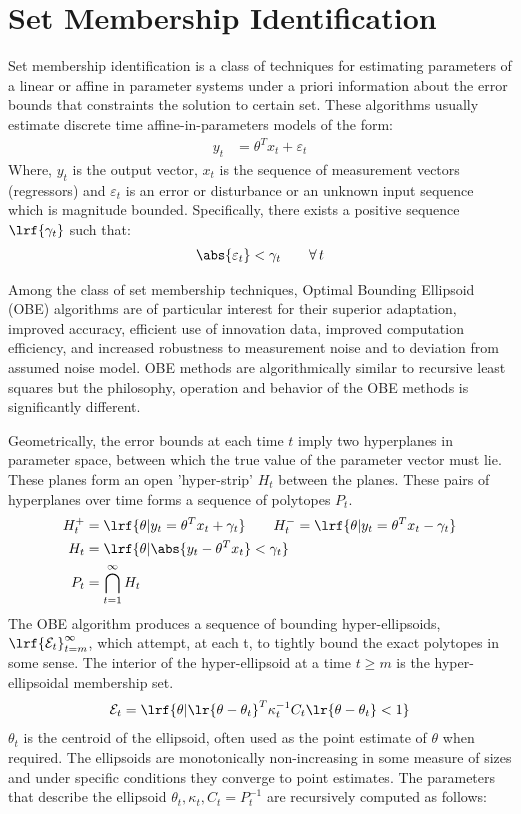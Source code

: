 \section{Set Membership Identification}

Set membership identification is a class of techniques for estimating parameters of a linear or affine in parameter systems under a priori information about the error bounds that constraints the solution to certain set. These algorithms usually estimate discrete time affine-in-parameters models of the form:
\begin{align}
        y_t &= \theta^T x_t + \varepsilon_t
\end{align}
Where, $y_t$ is the output vector, $x_t$ is the sequence of measurement vectors (regressors) and $\varepsilon_t$ is an error or disturbance or an unknown input sequence which is magnitude bounded. Specifically, there exists a positive sequence $\lrf{\gamma_t}$ such that:
\begin{align}
        \abs{\varepsilon_t} < \gamma_t \qquad \forall \, t
\end{align}

Among the class of set membership techniques, Optimal Bounding Ellipsoid (OBE) algorithms are of particular interest for their superior adaptation, improved accuracy, efficient use of innovation data, improved computation efficiency, and increased robustness to measurement noise and to deviation from assumed noise model. OBE methods are algorithmically similar to recursive least squares but the philosophy, operation and behavior of the OBE methods is significantly different.

Geometrically, the error bounds at each time $t$ imply two hyperplanes in parameter space, between which the true value of the parameter vector must lie. These planes form an open 'hyper-strip' $H_t$ between the planes. These pairs of hyperplanes over time forms a sequence of polytopes $P_t$.
\begin{align}
        H^+_t &= \lrf{\theta | y_t = \theta^T x_t + \gamma_t} \qquad
        H^-_t  = \lrf{\theta | y_t = \theta^T x_t - \gamma_t}\\
        H_t   &= \lrf{\theta | \abs{y_t - \theta^T x_t} < \gamma_t}\\
        P_t   &= \bigcap_{t=1}^{\infty} H_t
\end{align}
The OBE algorithm produces a sequence of bounding hyper-ellipsoids, $\lrf{\mathcal{E}_t}_{t = m}^{\infty}$, which attempt, at each t, to tightly bound the exact polytopes in some sense. The interior of the hyper-ellipsoid at a time $t \geq m$ is the hyper-ellipsoidal membership set.
\begin{align}
        \mathcal{E}_t = \lrf{\theta | \lr{\theta - \theta_t}^T \kappa_t^{-1} C_t \lr{\theta - \theta_t} < 1}
\end{align}
$\theta_t$ is the centroid of the ellipsoid, often used as the point estimate of $\theta$ when required. The ellipsoids
are monotonically non-increasing in some measure of sizes and under specific conditions they converge to point
estimates. The parameters that describe the ellipsoid $\theta_t, \kappa_t, C_t = P_t^{-1}$ are recursively computed as follows:

